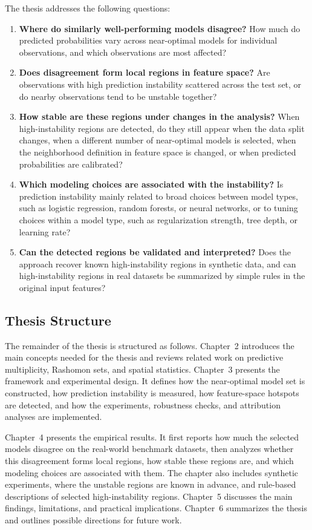 The thesis addresses the following questions:

\begin{enumerate}
    \item \textbf{Where do similarly well-performing models disagree?}  
    How much do predicted probabilities vary across near-optimal models for individual
    observations, and which observations are most affected?

    \item \textbf{Does disagreement form local regions in feature space?}  
    Are observations with high prediction instability scattered across the test set, or do
    nearby observations tend to be unstable together?

    \item \textbf{How stable are these regions under changes in the analysis?}  
    When high-instability regions are detected, do they still appear when the data split
    changes, when a different number of near-optimal models is selected, when the
    neighborhood definition in feature space is changed, or when predicted probabilities
    are calibrated?

    \item \textbf{Which modeling choices are associated with the instability?}  
    Is prediction instability mainly related to broad choices between model types, such
    as logistic regression, random forests, or neural networks, or to tuning choices within
    a model type, such as regularization strength, tree depth, or learning rate?

    \item \textbf{Can the detected regions be validated and interpreted?}
    Does the approach recover known high-instability regions in synthetic data, and can
    high-instability regions in real datasets be summarized by simple rules in the
    original input features?
\end{enumerate}

\subsection{Thesis Structure}

The remainder of the thesis is structured as follows. Chapter~2 introduces the main
concepts needed for the thesis and reviews related work on predictive multiplicity,
Rashomon sets, and spatial statistics. Chapter~3 presents the framework and experimental design. It defines how the
near-optimal model set is constructed, how prediction instability is measured, how
feature-space hotspots are detected, and how the experiments, robustness checks, and attribution analyses are implemented.

Chapter~4 presents the empirical results. It first reports how much the selected models
disagree on the real-world benchmark datasets, then analyzes whether this disagreement
forms local regions, how stable these regions are, and which modeling choices are
associated with them. The chapter also includes synthetic experiments, where the unstable
regions are known in advance, and rule-based descriptions of selected high-instability
regions. Chapter~5 discusses the main findings, limitations, and practical implications.
Chapter~6 summarizes the thesis and outlines possible directions for future work.